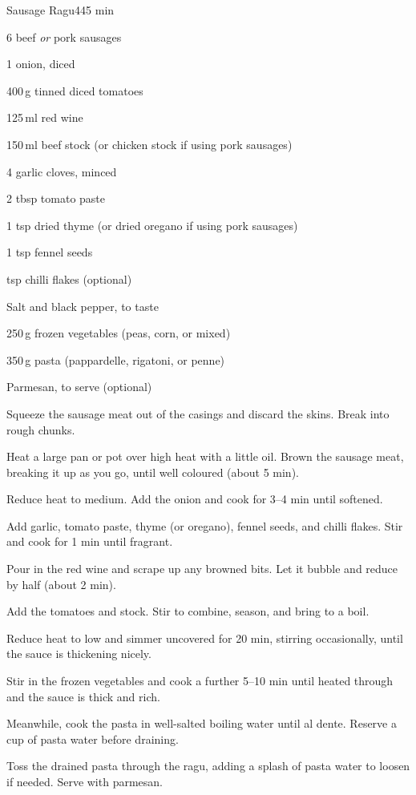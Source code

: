 \begin{recipebox}{Sausage Ragu}{4}{45 min}

\begin{ingredients}
  \item 6 beef \textit{or} pork sausages
  \item 1 onion, diced
  \item 400\,g tinned diced tomatoes
  \item 125\,ml red wine
  \item 150\,ml beef stock (or chicken stock if using pork sausages)
  \item 4 garlic cloves, minced
  \item 2 tbsp tomato paste
  \item 1 tsp dried thyme (or dried oregano if using pork sausages)
  \item 1 tsp fennel seeds
  \item {} tsp chilli flakes (optional)
  \item Salt and black pepper, to taste
  \item 250\,g frozen vegetables (peas, corn, or mixed)
  \item 350\,g pasta (pappardelle, rigatoni, or penne)
  \item Parmesan, to serve (optional)
\end{ingredients}

\begin{method}
  \item Squeeze the sausage meat out of the casings and discard the skins. Break into rough chunks.
  \item Heat a large pan or pot over high heat with a little oil. Brown the sausage meat, breaking it up as you go, until well coloured (about 5 min).
  \item Reduce heat to medium. Add the onion and cook for 3--4 min until softened.
  \item Add garlic, tomato paste, thyme (or oregano), fennel seeds, and chilli flakes. Stir and cook for 1 min until fragrant.
  \item Pour in the red wine and scrape up any browned bits. Let it bubble and reduce by half (about 2 min).
  \item Add the tomatoes and stock. Stir to combine, season, and bring to a boil.
  \item Reduce heat to low and simmer uncovered for 20 min, stirring occasionally, until the sauce is thickening nicely.
  \item Stir in the frozen vegetables and cook a further 5--10 min until heated through and the sauce is thick and rich.
  \item Meanwhile, cook the pasta in well-salted boiling water until al dente. Reserve a cup of pasta water before draining.
  \item Toss the drained pasta through the ragu, adding a splash of pasta water to loosen if needed. Serve with parmesan.
\end{method}


\end{recipebox}
